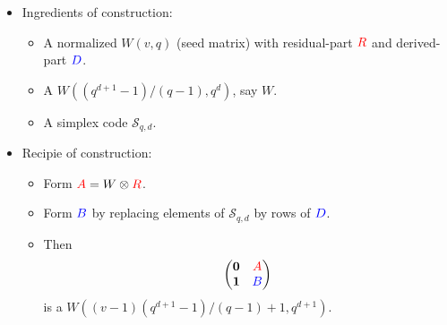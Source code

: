 \documentclass{beamer}
\newcommand{\RR}[1]{\textcolor{red}{#1}}
\newcommand{\BB}[1]{\textcolor{blue}{#1}}
\begin{document}


\begin{frame}

  \begin{itemize}
  \item Ingredients of construction:
    \begin{itemize} 
    \item A normalized $W(v,q)$ (seed matrix) with residual-part $\RR{R}$ and
      derived-part $\BB{D}$.
    \item A $W((q^{d+1}-1)/(q-1),q^d)$, say $W$.
    \item A simplex code $\mathcal{S}_{q,d}$.
    \end{itemize}
  \end{itemize}
  
\end{frame}

\begin{frame}

  \begin{itemize}
  \item Recipie of construction:
    \begin{itemize}
    \item Form $\RR{A} = W \otimes \RR{R}$.
    \item Form $\BB{B}$ by replacing elements of $\mathcal{S}_{q,d}$ by rows of
      $\BB{D}$. 
    \item Then
      \[
        \begin{pmatrix}
          \textbf{0} & \RR{A} \\
          \textbf{1} & \BB{B}
        \end{pmatrix}
      \]
      is a $W((v-1)(q^{d+1}-1)/(q-1)+1,q^{d+1})$.
    \end{itemize}
  \end{itemize}
  
\end{frame}

\end{document}
